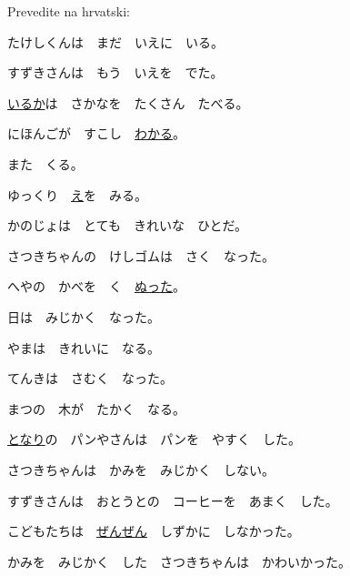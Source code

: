 	\begin{mondai}{Prevedite na hrvatski:}
		\item たけしくんは　まだ　いえに　いる。
		\item すずきさんは　もう　いえを　でた。
		\item \underline{いるか}は　さかなを　たくさん　たべる。
		\item にほんごが　すこし　\underline{わかる}。
		\item また　くる。
		\item ゆっくり　\underline{え}を　みる。
		\item かのじょは　とても　きれいな　ひとだ。
		\vspace{5pt}
		\item さつきちゃんの　けしゴムは　さく　なった。
		\item へやの　かべを　く　\underline{ぬった}。
		\vspace{10pt}
		\item 日は　みじかく　なった。
		\item やまは　きれいに　なる。
		\item てんきは　さむく　なった。
		\item まつの　木が　たかく　なる。
		\item \underline{となり}の　パンやさん\footnotemark[2]は　パンを　やすく　した。
		\item さつきちゃんは　かみを　みじかく　しない。
		\item すずきさんは　おとうとの　コーヒーを　あまく　した。
		\item こどもたちは　\underline{ぜんぜん}　しずかに　しなかった。
		\item *かみを　みじかく　した　さつきちゃんは　かわいかった。
	\end{mondai}


